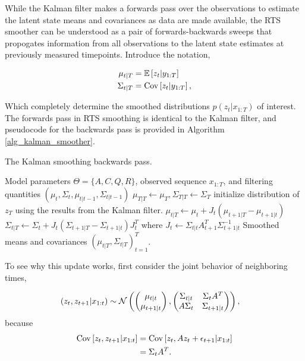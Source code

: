 \documentclass{article}
\begin{document}
While the Kalman filter makes a forwards pass over the observations to estimate
the latent state means and covariances as data are made available, the RTS
smoother can be understood as a pair of forwards-backwards sweeps that
propogates information from all observations to the latent state estimates at
previously measured timepoints. Introduce the notation,

\begin{align*}
\mu_{t \vert T} &= \mathbb{E}\left[{z_{t} \vert y_{1:T}}\right] \\
\Sigma_{t \vert T} &= \mathrm{Cov}\left[{z_{t} \vert y_{1:T}}\right],
\end{align*}

Which completely determine the smoothed distributions $p\left(z_{t} \vert
x_{1:T}\right)$ of interest. The forwards pass in RTS smoothing is identical to
the Kalman filter, and pseudocode for the backwards pass is provided in
Algorithm \ref{alg_kalman_smoother}.

\begin{algorithm}
   \caption{The Kalman smoothing backwards pass.}
   \label{alg:kalman_smoother}
\begin{algorithmic}
   Model parameters $\Theta = \{A, C, Q, R\}$,
    observed sequence $x_{1:T}$, and filtering quantities $\left(\mu_{t},
    \Sigma_{t}, \mu_{t \vert t - 1}, \Sigma_{t \vert t - 1}\right)$
    \STATE $\mu_{T \vert T} \leftarrow \mu_{T}, \Sigma_{T \vert T} \leftarrow
    \Sigma_{T}$ \hfill initialize distribution of $z_{T}$ using the results from
    the Kalman filter.
    \STATE $\mu_{t \vert T} \leftarrow \mu_{t} + J_{t}\left(\mu_{t + 1 \vert T} - \mu_{t + 1 \vert t}\right)$
    \STATE $\Sigma_{t \vert T} \leftarrow \Sigma_{t} + J_{t}\left(\Sigma_{t + 1 \vert T} - \Sigma_{t + 1 \vert t}\right)J_{t}^{T}$
    \STATE where $J_{t} \leftarrow \Sigma_{t \vert t}A_{t + 1}^{T} \Sigma_{t + 1\vert t}^{-1}$
    \ENDFOR
     Smoothed means and covariances $\left(\mu_{t \vert T},
    \Sigma_{t \vert T}\right)_{t = 1}^{T}$.
\end{algorithmic}
\end{algorithm}

To see why this update works, first consider the joint behavior of neighboring
times,

\begin{align*}
   \left(z_{t}, z_{t + 1} \vert x_{1:t}\right) &\sim \mathcal{N}\left(
\begin{pmatrix}
  \mu_{t \vert t} \\
  \mu_{t + 1 \vert t}
\end{pmatrix},
\begin{pmatrix}
  \Sigma_{t \vert t} & \Sigma_{t} A^{T} \\
  A \Sigma_{t} & \Sigma_{t + 1 \vert t}
\end{pmatrix}\right),
\end{align*}
because
\begin{align*}
\mathrm{Cov}\left[{z_{t}, z_{t + 1} \vert x_{1:t}}\right] &= \mathrm{Cov}\left[{z_{t}, Az_{t} + \epsilon_{t + 1} \vert x_{1:t}}\right] \\
&= \Sigma_{t}A^{T}.
\end{align*}
\end{document}
